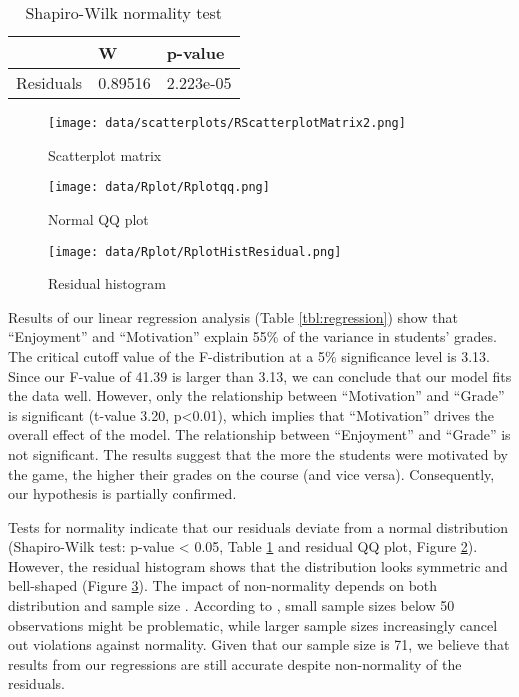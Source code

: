 \documentclass[sigconf]{acmart}
\begin{document}
\begin{table}[t]
\begin{tabular}{|r|l|l|}
\hline
 & W & p-value \\
 \hline
 Residuals & 0.89516 & 2.223e-05 \\
 \hline
\end{tabular}
\caption{\label{tbl:shapiro}Shapiro-Wilk normality test}
\end{table}

\begin{figure}[t]
\texttt{[image: data/scatterplots/RScatterplotMatrix2.png]}
\caption{\label{fig:matrix}Scatterplot matrix}
\end{figure}

\begin{figure}
\texttt{[image: data/Rplot/Rplotqq.png]}
\caption{\label{fig:qq} Normal QQ plot}
\end{figure}

\begin{figure}
\texttt{[image: data/Rplot/RplotHistResidual.png]}
\caption{\label{fig:res-hist} Residual histogram}
\end{figure}

Results of our linear regression analysis (Table \ref{tbl:regression})
show that ``Enjoyment'' and ``Motivation'' explain 55\% of the variance
in students' grades. The critical cutoff value of the F-distribution at
a 5\% significance level is 3.13. Since our F-value of 41.39 is larger
than 3.13, we can conclude that our model fits the data well. However,
only the relationship between ``Motivation'' and ``Grade'' is
significant (t-value 3.20, p\textless0.01), which implies that
``Motivation'' drives the overall effect of the model. The relationship
between ``Enjoyment'' and ``Grade'' is not significant. The results
suggest that the more the students were motivated by the game, the
higher their grades on the course (and vice versa). Consequently, our
hypothesis is partially confirmed.

Tests for normality indicate that our residuals deviate from a normal
distribution (Shapiro-Wilk test: p-value \textless{} 0.05, Table
\ref{tbl:shapiro} and residual QQ plot, Figure \ref{fig:qq}). However,
the residual histogram shows that the distribution looks symmetric and
bell-shaped (Figure \ref{fig:res-hist}). The impact of non-normality
depends on both distribution and sample size
\citep{hair2010multivariate}. According to \citep{hair2010multivariate},
small sample sizes below 50 observations might be problematic, while
larger sample sizes increasingly cancel out violations against
normality. Given that our sample size is 71, we believe that results
from our regressions are still accurate despite non-normality of the
residuals.
\end{document}

